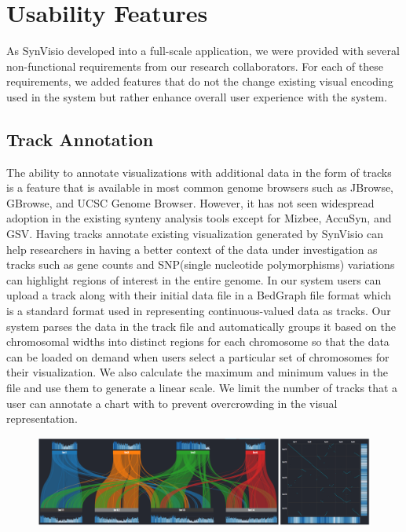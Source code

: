 \section{Usability Features}
As SynVisio developed into a full-scale application, we were provided with several non-functional requirements from our research collaborators. For each of these requirements, we added features that do not the change existing visual encoding used in the system but rather enhance overall user experience with the system. 

\subsection{Track Annotation}
The ability to annotate visualizations with additional data in the form of tracks is a feature that is available in most common genome browsers such as JBrowse, GBrowse, and UCSC Genome Browser\cite{skinner2009jbrowse,donlin2009using,karolchik2003ucsc}. However, it has not seen widespread adoption in the existing synteny analysis tools except for Mizbee,  AccuSyn, and GSV\cite{Meyer2009,accusyn,revanna2012web}.  Having tracks annotate existing visualization generated by SynVisio can help researchers in having a better context of the data under investigation as tracks such as gene counts and SNP(single nucleotide polymorphisms) variations can highlight regions of interest in the entire genome. In our system users can upload a track along with their initial data file in a BedGraph file format which is a standard format used in representing continuous-valued data as tracks. Our system parses the data in the track file and automatically groups it based on the chromosomal widths into distinct regions for each chromosome so that the data can be loaded on demand when users select a particular set of chromosomes for their visualization. We also calculate the maximum and minimum values in the file and use them to generate a linear scale. We limit the number of tracks that a user can annotate a chart with to prevent overcrowding in the visual representation.

\begin{figure}
  \centering
  \includegraphics[width=1\linewidth]{images/ch_5_tracks.PNG}
  \label{fig:ch_5_tracks}
\end{figure}


